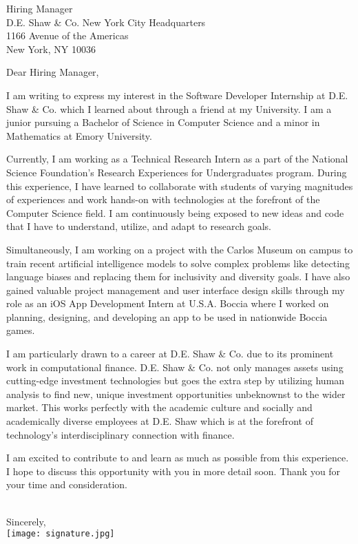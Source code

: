 \documentclass[letterpaper,12pt]{letter}
\date{}
\begin{document}
\begin{letter}{%
    Hiring Manager \\ 
    D.E. Shaw \& Co. New York City Headquarters  \\ 
    1166 Avenue of the Americas \\
    New York, NY 10036
}

\opening{Dear Hiring Manager,}

I am writing to express my interest in the Software Developer Internship at D.E. Shaw \& Co.
which I learned about through a friend at my University. I am a junior pursuing 
a Bachelor of Science in Computer Science and a minor in Mathematics at Emory University.

Currently, I am working as a Technical Research Intern as a part of the National Science Foundation's 
Research Experiences for Undergraduates program. During this experience, I have learned to 
collaborate with students of varying magnitudes of experiences and work hands-on with technologies at 
the forefront of the Computer Science field. I am continuously being exposed to new ideas 
and code that I have to understand, utilize, and adapt to research goals. 

Simultaneously, I am working on a project with the Carlos Museum on campus to train recent 
artificial intelligence models to solve complex problems like detecting language biases and 
replacing them for inclusivity and diversity goals. I have also gained valuable project management 
and user interface design skills through my role as an iOS App Development Intern at U.S.A. Boccia 
where I worked on planning, designing, and developing an app to be used in nationwide Boccia games. 

I am particularly drawn to a career at D.E. Shaw \& Co. due to its prominent work in 
computational finance. D.E. Shaw \& Co. not only manages assets using cutting-edge investment 
technologies but goes the extra step by utilizing human analysis to find new, unique investment
opportunities unbeknownst to the wider market. This works perfectly with the academic culture
and socially and academically diverse employees at D.E. Shaw which is at the forefront of 
technology's interdisciplinary connection with finance.

I am excited to contribute to and learn as much as possible from this experience. I hope to discuss
this opportunity with you in more detail soon. Thank you for your time and consideration. \\\\

\closing{Sincerely, \\
\vspace{10pt}
\texttt{[image: signature.jpg]}}


\end{letter}

\end{document}
